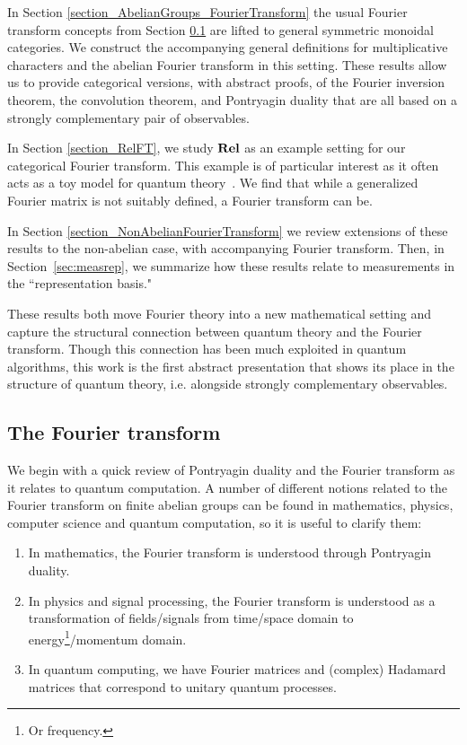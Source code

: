 In Section \ref{section_AbelianGroups_FourierTransform} the usual Fourier transform concepts from Section \ref{sec:FT} are lifted to general symmetric monoidal categories. We construct the accompanying general definitions for multiplicative characters and the abelian Fourier transform in this setting.  These results allow us to provide categorical versions, with abstract proofs, of the Fourier inversion theorem, the convolution theorem, and Pontryagin duality that are all based on a strongly complementary pair of observables.

In Section \ref{section_RelFT}, we study $\mathbf{Rel}$ as an example setting for our categorical Fourier transform. This example is of particular interest as it often acts as a toy model for quantum theory~\cite{evans2009classifying, cqm-notes, pavlovic2009quantum, zeng2015models}.  We find that while a generalized Fourier matrix is not suitably defined, a Fourier transform can be.

In Section \ref{section_NonAbelianFourierTransform} we review extensions of these results to the non-abelian case, with accompanying Fourier transform. Then, in Section~\ref{sec:measrep}, we summarize how these results relate to measurements in the ``representation basis."

These results both move Fourier theory into a new mathematical setting and capture the structural connection between quantum theory and the Fourier transform.  Though this connection has been much exploited in quantum algorithms, this work is the first abstract presentation that shows its place in the structure of quantum theory, i.e. alongside strongly complementary observables.
\subsection{The Fourier transform}
\label{sec:FT}
We begin with a quick review of Pontryagin duality and the Fourier transform as it relates to quantum computation. A number of different notions related to the Fourier transform on finite abelian groups can be found in mathematics, physics, computer science and quantum computation, so it is useful to clarify them:

\begin{enumerate}
  \item[1.] In mathematics, the Fourier transform is understood through Pontryagin duality.
  \item[2.] In physics and signal processing, the Fourier transform is understood as a transformation of fields/signals from time/space domain to energy\footnote{Or frequency.}/momentum domain.
  \item[3.] In quantum computing, we have Fourier matrices and (complex) Hadamard matrices that correspond to unitary quantum processes.
\end{enumerate}

